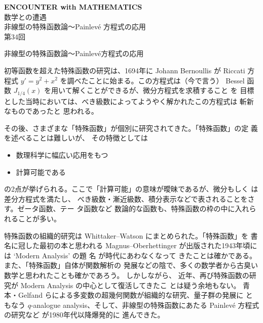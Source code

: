 \documentclass[uplatex,dvipdfmx]{jlreq}
\newcommand{\Painleve}{Painlevé}
\begin{document}
\begin{center}
  \vspace*{20pt}
  {\Huge\bfseries ENCOUNTER with MATHEMATICS}\\[10pt]
  {\Large 数学との遭遇}\\[20pt]
  {\large 非線型の特殊函数論〜Painlevé 方程式の応用}\\[10pt]
  {\large 第34回}
\end{center}
\vfill

\newpage


\begin{center}
{\large 非線型の特殊函数論〜\Painleve 方程式の応用}\\[6pt]
\hspace*{\fill}{\large\bfseries 大山 陽介（阪大・情報）}
\end{center}

\bigskip

初等函数を超えた特殊函数の研究は、1694年に Johann Bernoullis が
Riccati 方程式
$y'=y^2+x^2$ を調べたことに始まる。この方程式は（今で言う）
Bessel
函数 $J_{1/4}(x)$ を用いて解くことができるが、微分方程式を求積すること
を
目標とした当時においては、べき級数によってようやく解かれたこの方程式は
斬新なものであったと
思われる。

その後、さまざまな「特殊函数」が個別に研究されてきた。「特殊函数」の定
義を述べることは難しいが、
その特徴としては
\begin{itemize}
\item 数理科学に幅広い応用をもつ
\item 計算可能である
\end{itemize}
の2点が挙げられる。ここで「計算可能」の意味が曖昧であるが、微分もしく
は差分方程式を満たし、
べき級数・漸近級数、積分表示などで表されることをさす。ゼータ函数、テー
タ函数など
数論的な函数も、特殊函数の枠の中に入れられることが多い。

特殊函数の組織的研究は Whittaker--Watson にまとめられた。「特殊函数」を
書名に冠した最初の本と思われる
Magnus--Oberhettinger が出版された1943年頃には `Modern Analysis' の題
名
が時代にあわなくなって
きたことは確かである。また、「特殊函数」自体が関数解析の
発展などの陰で、多くの数学者から古臭い数学と思われたことも確かであろう。
しかしながら、
近年、再び特殊函数の研究が Modern Analysis の中心として復活してきたこ
とは疑う余地もない。
青本・Gelfand らによる多変数の超幾何関数が組織的な研究、量子群の発展に
ともなう $q$-analogue
analysis、そして、非線型の特殊函数にあたる Painlevé 方程式の研究など
が1980年代以降爆発的に
進んできた。
\end{document}
